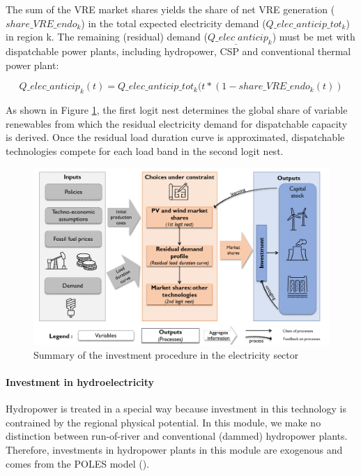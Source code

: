 The sum of the VRE market shares yields the share of net VRE generation ($share\_VRE\_endo_k$) in the total expected electricity demand ($Q\_elec\_anticip\_tot_k$)  in region k. The remaining (residual) demand ($Q\_elec_\_anticip_k$) must be met with dispatchable power plants, including hydropower, CSP and conventional thermal power plant:

\begin{dmath}
    Q\_elec\_anticip_k(t) = Q\_elec\_anticip\_tot_k(t*(1 - share\_VRE\_endo_{k}(t))
    \label{eqn:Q_elec}
\end{dmath}

As shown in Figure \ref{fig:suminv}, the first logit nest determines the global share of variable renewables from which the residual electricity demand for dispatchable capacity is derived. Once the residual load duration curve is approximated, dispatchable technologies compete for each load band in the second logit nest.

\begin{figure}[H]
    \centerline{\includegraphics[scale=0.45]{figures&tables/Summary_nexus.png}} %
    \caption{Summary of the investment procedure in the electricity sector}
    \label{fig:suminv}
\end{figure}


\paragraph{Investment in hydroelectricity}

Hydropower is treated in a special way because investment in this technology is contrained by the regional physical potential.
In this module, we make no distinction between run-of-river and conventional (dammed) hydropower plants. Therefore, investments in hydropower plants in this module are exogenous and comes from the POLES model (\cite{Keramidas2018}).


